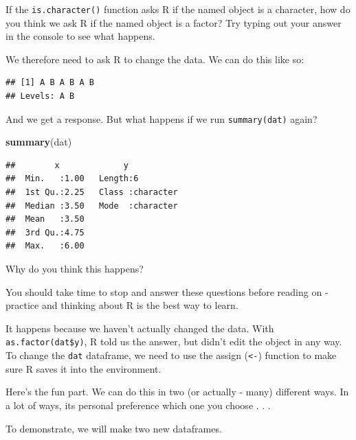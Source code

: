 \documentclass[
]{book}
\newenvironment{Shaded}{\begin{snugshade}}{\end{snugshade}}
\newcommand{\KeywordTok}[1]{\textcolor[rgb]{0.13,0.29,0.53}{\textbf{#1}}}
\newcommand{\NormalTok}[1]{#1}
\newcommand{\OperatorTok}[1]{\textcolor[rgb]{0.81,0.36,0.00}{\textbf{#1}}}
\begin{document}
If the \texttt{is.character()} function asks R if the named object is a character, how do you think we ask R if the named object is a factor? Try typing out your answer in the console to see what happens.

We therefore need to ask R to change the data. We can do this like so:

\begin{Shaded}
\end{Shaded}

\begin{verbatim}
## [1] A B A B A B
## Levels: A B
\end{verbatim}

And we get a response. But what happens if we run \texttt{summary(dat)} again?

\begin{Shaded}
\begin{Highlighting}[]
\KeywordTok{summary}\NormalTok{(dat)}
\end{Highlighting}
\end{Shaded}

\begin{verbatim}
##        x             y            
##  Min.   :1.00   Length:6          
##  1st Qu.:2.25   Class :character  
##  Median :3.50   Mode  :character  
##  Mean   :3.50                     
##  3rd Qu.:4.75                     
##  Max.   :6.00
\end{verbatim}

Why do you think this happens?

\begin{hey}
You should take time to stop and answer these questions before reading
on - practice and thinking about R is the best way to learn.
\end{hey}

It happens because we haven't actually changed the data. With \texttt{as.factor(dat\$y)}, R told us the answer, but didn't edit the object in any way. To change the \texttt{dat} dataframe, we need to use the assign (\texttt{\textless{}-}) function to make sure R saves it into the environment.

Here's the fun part. We can do this in two (or actually - many) different ways. In a lot of ways, its personal preference which one you choose . . .

To demonstrate, we will make two new dataframes.
\end{document}
